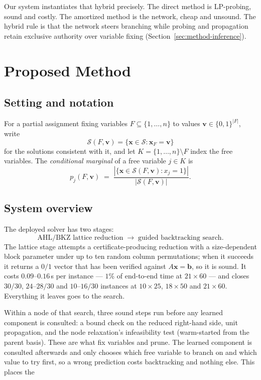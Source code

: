 \documentclass[final,5p,times,twocolumn]{elsarticle}
\newcommand{\SOL}{\mathcal{S}}
\begin{document}
Our system instantiates that hybrid precisely. The direct method is LP-probing, sound and costly. The amortized method is the network, cheap and unsound. The hybrid rule is that the network steers branching while probing and propagation retain exclusive authority over variable fixing (Section~\ref{sec:method-inference}).

\section{Proposed Method}
\label{sec:method}

\subsection{Setting and notation}

For a partial assignment fixing variables $F\subseteq\{1,\dots,n\}$ to values $\mathbf{v}\in\{0,1\}^{|F|}$, write
\begin{equation}
\SOL(F,\mathbf{v}) = \{\mathbf{x}\in\SOL : \mathbf{x}_F=\mathbf{v}\}
\end{equation}
for the solutions consistent with it, and let $K=\{1,\dots,n\}\setminus F$ index the free variables. The \emph{conditional marginal} of a free variable $j\in K$ is
\begin{equation}
p_j(F,\mathbf{v}) \;=\; \frac{|\{\mathbf{x}\in\SOL(F,\mathbf{v}) : x_j=1\}|}{|\SOL(F,\mathbf{v})|}.
\label{eq:condmarg}
\end{equation}

\subsection{System overview}
\label{sec:method-cascade}

The deployed solver has two stages:
\begin{equation}
\text{AHL/BKZ lattice reduction} \;\to\; \text{guided backtracking search}.
\end{equation}
The lattice stage attempts a certificate-producing reduction with a size-dependent block parameter under up to ten random column permutations; when it succeeds it returns a $0/1$ vector that has been verified against $A\mathbf{x}=\mathbf{b}$, so it is sound. It costs $0.09$--$0.16$\,s per instance --- $1\%$ of end-to-end time at $21\times60$ --- and closes $30/30$, $24$--$28/30$ and $10$--$16/30$ instances at $10\times25$, $18\times50$ and $21\times60$. Everything it leaves goes to the search.

Within a node of that search, three sound steps run before any learned component is consulted: a bound check on the reduced right-hand side, unit propagation, and the node relaxation's infeasibility test (warm-started from the parent basis). These are what fix variables and prune. The learned component is consulted afterwards and only chooses which free variable to branch on and which value to try first, so a wrong prediction costs backtracking and nothing else. This places the
\end{document}
